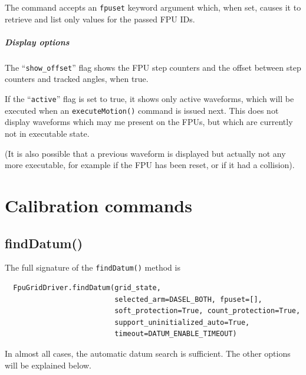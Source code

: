 \documentclass[fontsize=12,a4paper]{scrreprt}
\begin{document}
The command accepts an \texttt{fpuset} keyword argument which, when
set, causes it to retrieve and list only values for the passed FPU
IDs.

\paragraph{Display options}

The ``\texttt{show\_offset}'' flag shows the FPU step counters and
the offset between step counters and tracked angles, when
true.

If the ``\texttt{active}'' flag is set to true, it shows only active
waveforms, which will be executed when an \texttt{executeMotion()}
command is issued next. This does not display waveforms which may me
present on the FPUs, but which are currently not in executable state.

(It is also possible that a previous waveform is displayed but
actually not any more executable, for example if the FPU has been
reset, or if it had a collision).

\chapter{Calibration commands}

\section{findDatum()}
\label{sec:finddatum}

The full signature of the \texttt{findDatum()} method is

\begin{verbatim}
  FpuGridDriver.findDatum(grid_state,
                          selected_arm=DASEL_BOTH, fpuset=[],
                          soft_protection=True, count_protection=True,
                          support_uninitialized_auto=True,
                          timeout=DATUM_ENABLE_TIMEOUT)
\end{verbatim}

In almost all cases, the automatic datum search is sufficient.  The
other options will be explained below.
\end{document}
